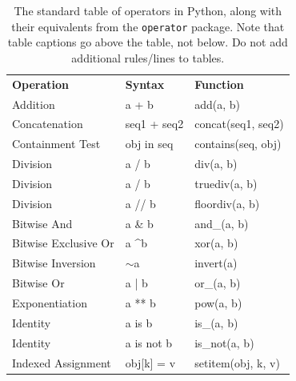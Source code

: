 \documentclass{l4proj}
\begin{document}
\begin{table}[]
    \caption{The standard table of operators in Python, along with their equivalents from the \texttt{operator} package. Note that table
    captions go above the table, not below. Do not add additional rules/lines to tables. }\label{tab:operators}
    \begin{tabular}{@{}lll@{}}
    \textbf{Operation}    & \textbf{Syntax}                & \textbf{Function}                            \\ %
    Addition              & a + b                          & add(a, b)                                    \\
    Concatenation         & seq1 + seq2                    & concat(seq1, seq2)                           \\
    Containment Test      & obj in seq                     & contains(seq, obj)                           \\
    Division              & a / b                          & div(a, b)                                    \\
    Division              & a / b                          & truediv(a, b)                                \\
    Division              & a // b                         & floordiv(a, b)                               \\
    Bitwise And           & a \& b                         & and\_(a, b)                                  \\
    Bitwise Exclusive Or  & a \textasciicircum b           & xor(a, b)                                    \\
    Bitwise Inversion     & $\sim$a                        & invert(a)                                    \\
    Bitwise Or            & a | b                          & or\_(a, b)                                   \\
    Exponentiation        & a ** b                         & pow(a, b)                                    \\
    Identity              & a is b                         & is\_(a, b)                                   \\
    Identity              & a is not b                     & is\_not(a, b)                                \\
    Indexed Assignment    & obj{[}k{]} = v                 & setitem(obj, k, v)                           \\

\end{tabular}
\end{table}
\end{document}
